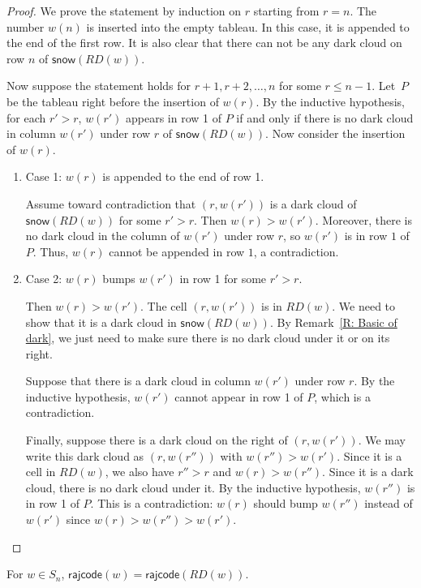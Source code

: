 \documentclass[10pt]{amsart}
\theoremstyle{plain}
\theoremstyle{plain}
\theoremstyle{definition}
\theoremstyle{definition}
\theoremstyle{definition}
\theoremstyle{plain}
\theoremstyle{plain}
\theoremstyle{plain}
\theoremstyle{plain}
\theoremstyle{plain}
\theoremstyle{remark}
\theoremstyle{remark}
\theoremstyle{plain}
\theoremstyle{plain}
\newcommand{\snow}{\mathsf{snow}}
\newcommand{\rajcode}{\mathsf{rajcode}}
\begin{document}
\begin{proof}
We prove the statement by induction on $r$ starting from $r=n$.
The number $w(n)$ is inserted into the empty tableau. 
In this case, it is appended to the end of the first row. 
It is also clear that there can not be any dark cloud on row $n$ of $\snow(RD(w))$.

Now suppose the statement holds for $r+1,r+2,\dots,n$ for some $r \leqslant n-1$. 
Let~$P$ be the tableau right before the insertion of $w(r)$.
By the inductive hypothesis, for each $r' > r$, $w(r')$ appears in row 1 of $P$
if and only if there is no dark cloud in column $w(r')$ under row $r$ of $\snow(RD(w))$.
Now consider the insertion of $w(r)$.
\begin{enumerate}
\item Case 1: $w(r)$ is appended to the end of row 1. 

Assume toward contradiction that $(r, w(r'))$ is a dark cloud of $\snow(RD(w))$ for some $r' > r$. 
Then $w(r) > w(r')$. 
Moreover, there is no dark cloud in the column of $w(r')$ under row $r$,
so $w(r')$ is in row $1$ of $P$. 
Thus, $w(r)$ cannot be appended in row $1$, a contradiction.
\item Case 2: $w(r)$ bumps $w(r')$ in row 1 for some $r' > r$.

Then $w(r) > w(r')$.
The cell $(r, w(r'))$ is in $RD(w)$. We need to show that it is a dark cloud in $\snow(RD(w))$.
By Remark~\ref{R: Basic of dark}, we just need to make sure
there is no dark cloud under it or on its right.

Suppose that there is a dark cloud in column $w(r')$ under row $r$. By the inductive hypothesis, $w(r')$ cannot appear in row 1 of $P$, which is a contradiction.

Finally, suppose there is a dark cloud on the right of $(r, w(r'))$.
We may write this dark cloud as $(r, w(r''))$ with $w(r'') > w(r')$.
Since it is a cell in $RD(w)$,
we also have $r'' > r$ and $w(r) > w(r'')$.
Since it is a dark cloud, there is no dark cloud under it.
By the inductive hypothesis, $w(r'')$ is in row 1 of $P$.
This is a contradiction: $w(r)$ should bump $w(r'')$ instead of $w(r')$ 
since $w(r) > w(r'') > w(r')$. \qedhere
\end{enumerate}
\end{proof}


\begin{ourthm}
\label{T: equivalence of rajcode on perm}
For $w \in S_n$, 
$\rajcode(w) = \rajcode(RD(w))$.
\end{ourthm}
\end{document}

